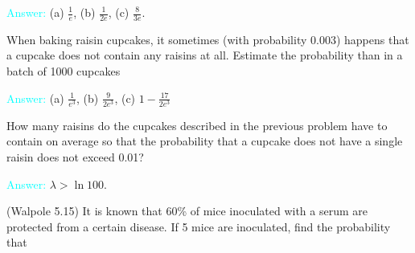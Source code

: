 \documentclass[14pt]{exam}
\begin{document}
\begin{questions}
		
		\textcolor{cyan}{Answer:} (a) $\frac{1}{e}$, (b) $\frac{1}{2e}$, (c) $\frac{8}{3e}$.
		
		\question
		When baking raisin cupcakes, it sometimes (with probability 0.003) happens that a cupcake does not contain any raisins at all. Estimate the probability than in a batch of 1000 cupcakes
		
		
		\textcolor{cyan}{Answer:} (a) $\frac{1}{e^3}$, (b) $\frac{9}{2e^3}$, (c) $1 - \frac{17}{2e^3}$
		
		\question
		How many raisins do the cupcakes described in the previous problem have to contain on average so that the probability that a cupcake does not have a single raisin does not exceed 0.01?
		
		\textcolor{cyan}{Answer:} $\lambda > \ln 100$.
		
		\question
		(Walpole 5.15) It is known that 60\% of mice inoculated with a serum are protected from a certain disease. If 5 mice are inoculated, find the probability that
		

\end{questions}
\end{document}
